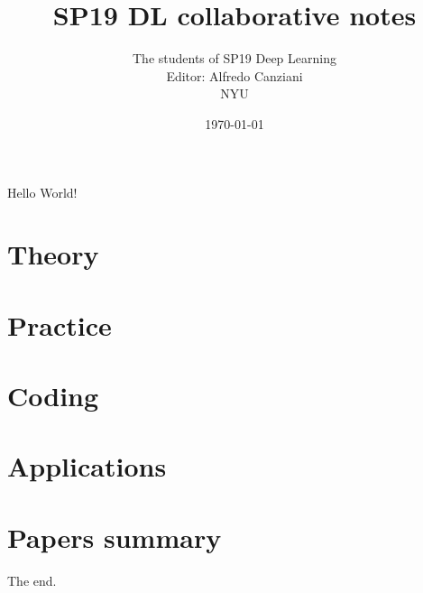 \documentclass{book}
\title{SP19 DL collaborative notes}
\author{
  The students of SP19 Deep Learning\\
  Editor: Alfredo Canziani\\
  NYU
}
\date{\today}
\begin{document}
\maketitle




\tableofcontents
Hello World! 
\part{Theory}\label{prt:theory}
\part{Practice}\label{prt:practice}
\part{Coding}\label{prt:coding}
\part{Applications}\label{prt:apps}
\part{Papers summary}\label{prt:papers}

The end.  %
\end{document}
